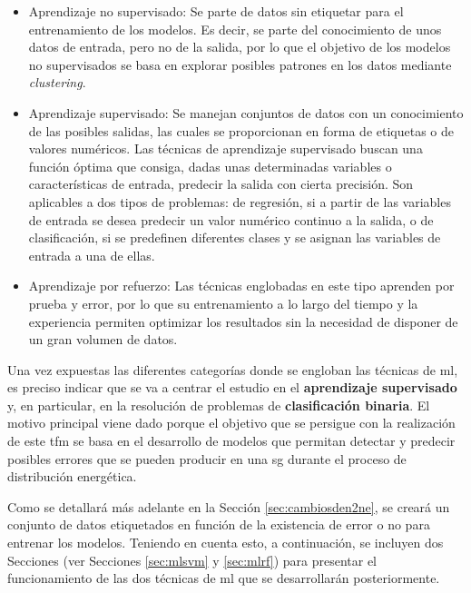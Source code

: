 \begin{itemize}
    \item Aprendizaje no supervisado: Se parte de datos sin etiquetar para el entrenamiento de los modelos. Es decir, se parte del conocimiento de unos datos de entrada, pero no de la salida, por lo que el objetivo de los modelos no supervisados se basa en explorar posibles patrones en los datos mediante \textit{clustering}.
    \item Aprendizaje supervisado: Se manejan conjuntos de datos con un conocimiento de las posibles salidas, las cuales se proporcionan en forma de etiquetas o de valores numéricos. Las técnicas de aprendizaje supervisado buscan una función óptima que consiga, dadas unas determinadas variables o características de entrada, predecir la salida con cierta precisión. Son aplicables a dos tipos de problemas: de regresión, si a partir de las variables de entrada se desea predecir un valor numérico continuo a la salida, o de clasificación, si se predefinen diferentes clases y se asignan las variables de entrada a una de ellas. 
    \item Aprendizaje por refuerzo: Las técnicas englobadas en este tipo aprenden por prueba y error, por lo que su entrenamiento a lo largo del tiempo y la experiencia permiten optimizar los resultados sin la necesidad de disponer de un gran volumen de datos.
\end{itemize}

Una vez expuestas las diferentes categorías donde se engloban las técnicas de \gls{ml}, es preciso indicar que se va a centrar el estudio en el \textbf{aprendizaje supervisado} y, en particular, en la resolución de problemas de \textbf{clasificación binaria}. El motivo principal viene dado porque el objetivo que se persigue con la realización de este \gls{tfm} se basa en el desarrollo de modelos que permitan detectar y predecir posibles errores que se pueden producir en una \gls{sg} durante el proceso de distribución energética. 

\vspace{3mm}

Como se detallará más adelante en la Sección \ref{sec:cambiosden2ne}, se creará un conjunto de datos etiquetados en función de la existencia de error o no para entrenar los modelos. Teniendo en cuenta esto, a continuación, se incluyen dos Secciones (ver Secciones \ref{sec:mlsvm} y \ref{sec:mlrf}) para presentar el funcionamiento de las dos técnicas de \gls{ml} que se desarrollarán posteriormente.

